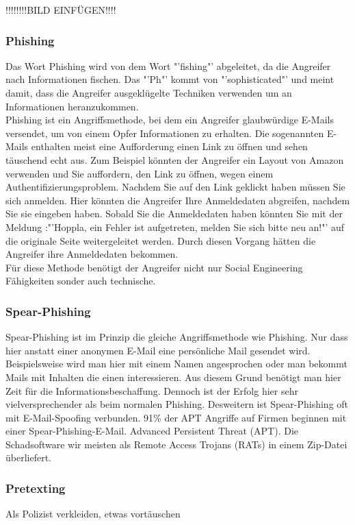 !!!!!!!!BILD EINFÜGEN!!!!\\

\subsubsection{Phishing}
Das Wort Phishing wird von dem Wort "'fishing"' abgeleitet, da die Angreifer nach Informationen fischen. Das "'Ph"' kommt von "'sophisticated"' und meint damit, dass die Angreifer ausgeklügelte Techniken verwenden um an Informationen heranzukommen.\cite{PhishingExposed}\\
Phishing ist ein Angriffsmethode, bei dem ein Angreifer glaubwürdige E-Mails versendet, um von einem Opfer Informationen zu erhalten. Die sogenannten E-Mails enthalten meist eine Aufforderung einen Link zu öffnen und sehen täuschend echt aus. Zum Beispiel könnten der Angreifer ein Layout von Amazon verwenden und Sie auffordern, den Link zu öffnen, wegen einem Authentifizierungsproblem. Nachdem Sie auf den Link geklickt haben müssen Sie sich anmelden. Hier könnten die Angreifer Ihre Anmeldedaten abgreifen, nachdem Sie sie eingeben haben. Sobald Sie die Anmeldedaten haben könnten Sie mit der Meldung :"'Hoppla, ein Fehler ist aufgetreten, melden Sie sich bitte neu an!"' auf die originale Seite weitergeleitet werden. Durch diesen Vorgang hätten die Angreifer ihre Anmeldedaten bekommen.\\
Für diese Methode benötigt der Angreifer nicht nur Social Engineering Fähigkeiten sonder auch technische.\cite{PhishingDarkWaters}

\subsubsection{Spear-Phishing}
Spear-Phishing ist im Prinzip die gleiche Angriffsmethode wie Phishing. Nur dass hier anstatt einer anonymen E-Mail eine persönliche Mail gesendet wird. Beispielsweise wird man hier mit einem Namen angesprochen oder man bekommt Mails mit Inhalten die einen interessieren. Aus diesem Grund benötigt man hier Zeit für die Informationsbeschaffung. Dennoch ist der Erfolg hier sehr vielversprechender als beim normalen Phishing. Desweitern ist Spear-Phishing oft mit E-Mail-Spoofing verbunden.
91\% der APT Angriffe auf Firmen beginnen mit einer Spear-Phishing-E-Mail. Advanced Persistent Threat (APT). Die Schadsoftware wir meisten als Remote Access Trojans (RATs) in einem Zip-Datei überliefert.

\subsubsection{Pretexting}
Als Polizist verkleiden, etwas vortäuschen

